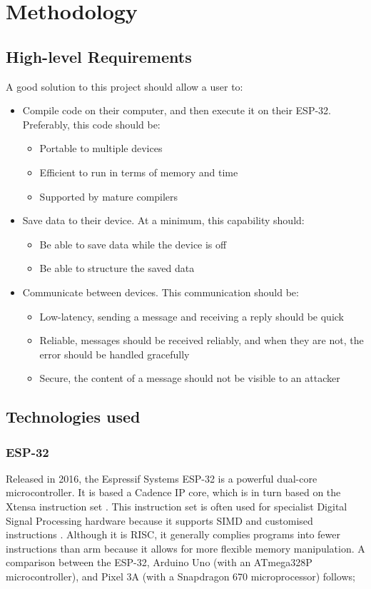 \documentclass{article}
\begin{document}
\section{Methodology}
\subsection{High-level Requirements}
A good solution to this project should allow a user to:
\begin{itemize}
\item Compile code on their computer, and then execute it on their ESP-32. Preferably, this code should be:
\begin{itemize}
  \item Portable to multiple devices
  \item Efficient to run in terms of memory and time
  \item Supported by mature compilers
\end{itemize}
\item Save data to their device. At a minimum, this capability should:
\begin{itemize}
  \item Be able to save data while the device is off
  \item Be able to structure the saved data
\end{itemize}
\item Communicate between devices. This communication should be:
\begin{itemize}
  \item Low-latency, sending a message and receiving a reply should be quick
  \item Reliable, messages should be received reliably, and when they are not, the error should be handled gracefully
  \item Secure, the content of a message should not be visible to an attacker
\end{itemize}
\end{itemize}
\subsection{Technologies used}
\subsubsection{ESP-32}

Released in 2016, the Espressif Systems ESP-32 is a powerful dual-core microcontroller.
It is based a Cadence IP core, which is in turn based on the Xtensa instruction set \cite{32datasheet}.
This instruction set is often used for specialist Digital Signal Processing hardware because it supports SIMD and customised instructions \cite{lx6datasheet}.
Although it is RISC, it generally complies programs into fewer instructions than arm because it allows for more flexible memory manipulation.
A comparison between the ESP-32, Arduino Uno (with an ATmega328P microcontroller), and Pixel 3A (with a Snapdragon 670 microprocessor) follows;
\end{document}
